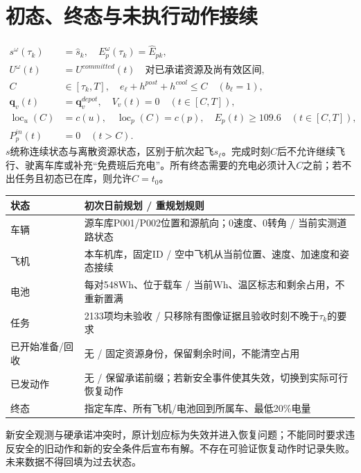 \section{初态、终态与未执行动作接续}
\begin{align}
 s^\omega(\tau_k)&=\widehat s_k,\quad
 E_p^\omega(\tau_k)=\widehat E_{pk},\label{eng:eq:initialstate}\\
 U^\omega(t)&=U^{committed}(t)\quad\text{对已承诺资源及尚有效区间},\label{eng:eq:commitment}\\
 C&\in[\tau_k,T],\quad e_\ell+h^{post}+h^{cool}\le C\quad(b_\ell=1),\\
 \mathbf q_v(t)&=\mathbf q_v^{depot},\quad V_v(t)=0\quad(t\in[C,T]),\\
 \operatorname{loc}_u(C)&=c(u),\quad\operatorname{loc}_p(C)=c(p),\quad
 E_p(t)\ge109.6\quad(t\in[C,T]),\label{eng:eq:terminal}\\
 P_p^{in}(t)&=0\quad(t>C).
\end{align}
\noindent $s$统称连续状态与离散资源状态，区别于航次起飞$s_\ell$。完成时刻$C$后不允许继续飞行、驶离车库或补充“免费班后充电”。所有终态需要的充电必须计入$C$之前；若不出任务且初态已在库，则允许$C=t_0$。
\begin{center}\small
\begin{tabular}{p{.25\linewidth}p{.65\linewidth}}\toprule
状态 & 初次日前规划 / 重规划规则\\\midrule
车辆 & 源车库P001/P002位置和源航向；0速度、0转角 / 当前实测道路状态\\
飞机 & 本车机库，固定ID / 空中飞机从当前位置、速度、加速度和姿态接续\\
电池 & 每对548Wh、位于载车 / 当前Wh、温区标志和剩余占用，不重新置满\\
任务 & 2133项均未验收 / 只移除有图像证据且验收时刻不晚于$\tau_k$的要求\\
已开始准备/回收 & 无 / 固定资源身份，保留剩余时间，不能清空占用\\
已发动作 & 无 / 保留承诺前缀；若新安全事件使其失效，切换到实际可行恢复动作\\
终态 & 指定车库、所有飞机/电池回到所属车、最低20\%电量\\\bottomrule
\end{tabular}\end{center}
\noindent 新安全观测与硬承诺冲突时，原计划应标为失效并进入恢复问题；不能同时要求违反安全的旧动作和新的安全条件后宣布有解。不存在可验证恢复动作时记录失败。未来数据不得回填为过去状态。
\clearpage

